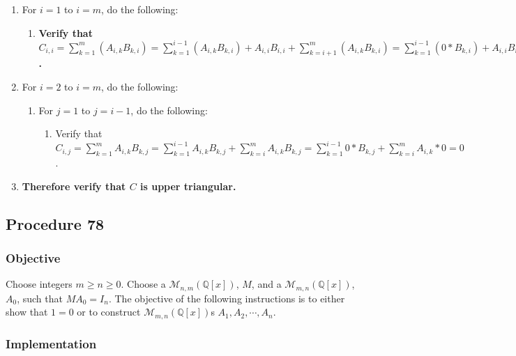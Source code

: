 \documentclass[twocolumn]{article}
\newcommand{\procedure}[2][]{\subsection*{Procedure #2 \ifthenelse{\equal{#1}{}}{}{(#1)}}\label{sec:procedure #2}}
\newcommand{\objective}{\subsubsection*{Objective}}
\newcommand{\implementation}{\subsubsection*{Implementation}}
\begin{document}
				\begin{enumerate}
					\item For $i=1$ to $i=m$, do the following:
					\begin{enumerate}
						\item \textbf{Verify that $C_{i,i}=\sum_{k=1}^m (A_{i,k}B_{k,i})=\sum_{k=1}^{i-1} (A_{i,k}B_{k,i})+A_{i,i}B_{i,i}+\sum_{k=i+1}^m (A_{i,k}B_{k,i})=\sum_{k=1}^{i-1} (0*B_{k,i})+A_{i,i}B_{i,i}+\sum_{k=i+1}^m (A_{i,k}*0)=A_{i,i}B_{i,i}$.}
					\end{enumerate}
					\item For $i=2$ to $i=m$, do the following:
					\begin{enumerate}
						\item For $j=1$ to $j=i-1$, do the following:
						\begin{enumerate}
							\item Verify that $C_{i,j}=\sum_{k=1}^m A_{i,k}B_{k,j}=\sum_{k=1}^{i-1} A_{i,k}B_{k,j}+\sum_{k=i}^m A_{i,k}B_{k,j}=\sum_{k=1}^{i-1} 0*B_{k,j}+\sum_{k=i}^m A_{i,k}*0=0$.
						\end{enumerate}
					\end{enumerate}
					\item \textbf{Therefore verify that $C$ is upper triangular.}
				\end{enumerate}
		\procedure{78}
			\objective
				Choose integers $m\ge n\ge 0$. Choose a $\mathcal{M}_{n,m}(\mathbb{Q}[x])$, $M$, and a $\mathcal{M}_{m,n}(\mathbb{Q}[x])$, $A_0$, such that $MA_0=I_n$. The objective of the following instructions is to either show that $1=0$ or to construct $\mathcal{M}_{m,n}(\mathbb{Q}[x])$s $A_1,A_2,\cdots,A_n$.
			\implementation
\end{document}
